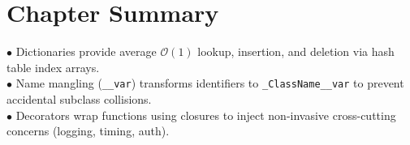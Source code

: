 \section{Chapter Summary}
\begin{summarybox}
$\bullet$ Dictionaries provide average $\mathcal{O}(1)$ lookup, insertion, and deletion via hash table index arrays.\\
$\bullet$ Name mangling (\texttt{\_\_var}) transforms identifiers to \texttt{\_ClassName\_\_var} to prevent accidental subclass collisions.\\
$\bullet$ Decorators wrap functions using closures to inject non-invasive cross-cutting concerns (logging, timing, auth).
\end{summarybox}
